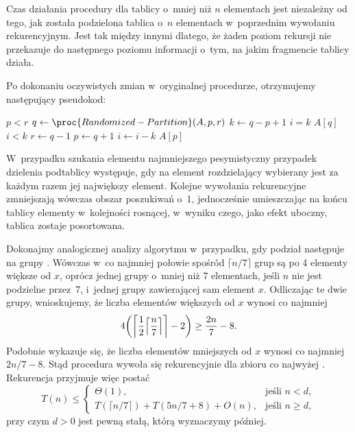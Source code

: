 \exercise %
Czas działania procedury  dla tablicy o~mniej niż $n$ elementach jest niezależny od tego, jak została podzielona tablica o~$n$ elementach w~poprzednim wywołaniu rekurencyjnym. Jest tak między innymi dlatego, że żaden poziom rekursji nie przekazuje do następnego poziomu informacji o~tym, na jakim fragmencie tablicy działa.

\exercise %
Po dokonaniu oczywistych zmian w~oryginalnej procedurze, otrzymujemy następujący pseudokod:
\begin{codebox}
\li	\While $p<r$
\li		\Do
			$q\gets\proc{Randomized-Partition}(A,p,r)$
\li			$k\gets q-p+1$
\li			\If $i=k$
\li				\Then \Return $A[q]$
				\End
\li			\If $i<k$
\li				\Then $r\gets q-1$
\li				\Else
					$p\gets q+1$
\li					$i\gets i-k$
				\End
		\End
\li	\Return $A[p]$
\end{codebox}

\exercise %
W~przypadku szukania elementu najmniejszego pesymistyczny przypadek dzielenia podtablicy występuje, gdy na element rozdzielający wybierany jest za każdym razem jej największy element. Kolejne wywołania rekurencyjne zmniejszają wówczas obszar poszukiwań o~1, jednocześnie umieszczając na końcu tablicy elementy w~kolejności rosnącej, w~wyniku czego, jako efekt uboczny, tablica zostaje posortowana.


\exercise %
Dokonajmy analogicznej analizy algorytmu  w~przypadku, gdy podział następuje na grupy . Wówczas w~co najmniej połowie spośród $\lceil n/7\rceil$ grup są po 4 elementy większe od $x$, oprócz jednej grupy o~mniej niż 7 elementach, jeśli $n$ nie jest podzielne przez~7, i~jednej grupy zawierającej sam element $x$. Odliczając te dwie grupy, wnioskujemy, że liczba elementów większych od $x$ wynosi co najmniej
\[
	4\biggl(\biggl\lceil\frac{1}{2}\Bigl\lceil\frac{n}{7}\Bigr\rceil\biggr\rceil-2\biggr) \ge \frac{2n}{7}-8.
\]
Podobnie wykazuje się, że liczba elementów mniejszych od $x$ wynosi co najmniej $2n/7-8$. Stąd procedura wywoła się rekurencyjnie dla zbioru co najwyżej . Rekurencja przyjmuje więc postać
\[
	T(n) \le \begin{cases}
		\Theta(1), & \text{jeśli $n<d$}, \\
		T(\lceil n/7\rceil)+T(5n/7+8)+O(n), & \text{jeśli $n\ge d$},
	\end{cases}
\]
przy czym $d>0$ jest pewną stałą, którą wyznaczymy później.

